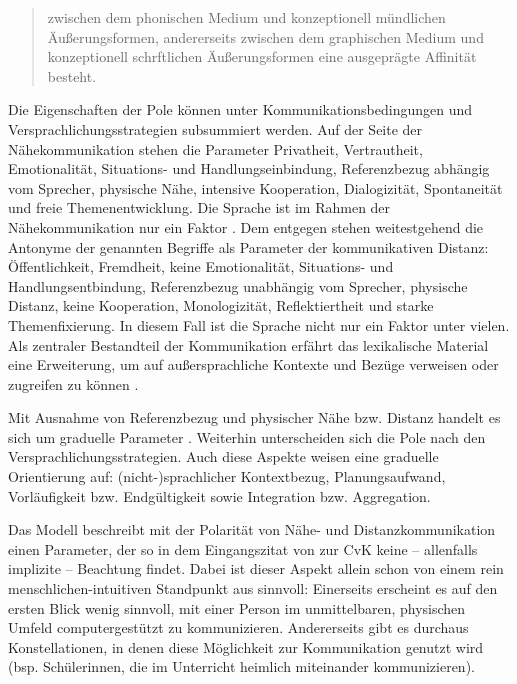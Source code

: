 \begin{quote}
zwischen dem phonischen Medium und konzeptionell mündlichen Äußerungsformen, andererseits zwischen dem graphischen Medium und konzeptionell schrftlichen Äußerungsformen eine ausgeprägte Affinität besteht. \citep[587]{koch_schriftlichkeit_1994}
\end{quote}

Die Eigenschaften der Pole können unter Kommunikationsbedingungen und Versprachlichungsstrategien subsummiert werden. Auf der Seite der Nähekommunikation stehen die Parameter Privatheit, Vertrautheit, Emotionalität, Si\-tu\-ati\-ons- und Handlungseinbindung, Referenzbezug abhängig vom Sprecher, physische Nähe, intensive Kooperation, Dialogizität, Spontaneität und freie Themenentwicklung. Die Sprache ist im Rahmen der Nähekommunikation nur ein Faktor \citep[591]{koch_schriftlichkeit_1994}. Dem entgegen stehen weitestgehend die Antonyme der genannten Begriffe als Parameter der kommunikativen Distanz: Öffentlichkeit, Fremdheit, keine Emotionalität, Situations- und Handlungsentbindung, Referenzbezug unabhängig vom Sprecher, physische Distanz, keine Kooperation, Monologizität, Reflektiertheit und starke Themenfixierung. In diesem Fall ist die Sprache nicht nur ein Faktor unter vielen. Als zentraler Bestandteil der Kommunikation erfährt das lexikalische Material eine Erweiterung, um auf außersprachliche Kontexte und Bezüge verweisen oder zugreifen zu können \citep[591]{koch_schriftlichkeit_1994}.

Mit Ausnahme von Referenzbezug und physischer Nähe bzw. Distanz handelt es sich um graduelle Parameter \citep[7]{koch_gesprochene_2011}. Weiterhin unterscheiden sich die Pole nach den Versprachlichungsstrategien. Auch diese Aspekte weisen eine graduelle Orientierung auf: (nicht-)sprachlicher Kontextbezug, Planungsaufwand, Vorläufigkeit bzw. Endgültigkeit sowie Integration bzw. Aggregation.

Das Modell beschreibt mit der Polarität von Nähe- und Distanzkommunikation einen Parameter, der so in dem Eingangszitat von \citeauthor{trepte_medienpsychologie_2012} zur CvK keine -- allenfalls implizite -- Beachtung findet. Dabei ist dieser Aspekt allein schon von einem rein menschlichen-intuitiven Standpunkt aus sinnvoll: Einerseits erscheint es auf den ersten Blick wenig sinnvoll, mit einer Person im unmittelbaren, physischen Umfeld computergestützt zu kommunizieren. Andererseits gibt es durchaus Konstellationen, in denen diese Möglichkeit zur Kommunikation genutzt wird (bsp. Schüler{\textperiodcentered}innen, die im Unterricht heimlich miteinander kommunizieren).

